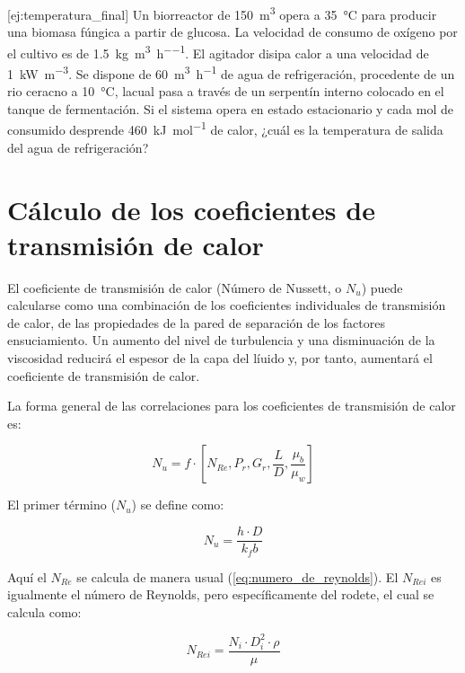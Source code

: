 \documentclass{AsignaturaResumen}
\begin{document}
[ej:temperatura_final]{
    Un biorreactor de \qty{150}{\m\cubed} opera a \qty{35}{\degreeCelsius} para producir una biomasa fúngica a partir de glucosa. La velocidad de consumo de oxígeno por el cultivo es de \qty{1.5}{\kg\per\m\cubed\per\hour}. El agitador disipa calor a una velocidad de \qty{1}{\kilo\watt\per\m\cubed}. Se dispone de \qty{60}{\m\cubed\per\hour} de agua de refrigeración, procedente de un rio ceracno a \qty{10}{\degreeCelsius}, lacual pasa a través de un serpentín interno colocado en el tanque de fermentación. Si el sistema opera en estado estacionario y cada mol de  consumido desprende \qty{460}{\kilo\J\per\mole} de calor, ¿cuál es la temperatura de salida del agua de refrigeración?
}


\section{Cálculo de los coeficientes de transmisión de calor}

El coeficiente de transmisión de calor (Número de Nussett, o $N_{u}$) puede calcularse como una combinación de los coeficientes individuales de transmisión de calor, de las propiedades de la pared de separación de los factores ensuciamiento. Un aumento del nivel de turbulencia y una disminuación de la viscosidad reducirá el espesor de la capa del líuido y, por tanto, aumentará el coeficiente de transmisión de calor.

La forma general de las correlaciones para los coeficientes de transmisión de calor es:

\begin{equation}
    N_{u} = f \cdot [N_{Re}, P_{r}, G_{r}, \frac{L}{D}, \frac{\mu_{b}}{\mu_{w}}]
\end{equation}

El primer término ($N_{u}$) se define como:

\begin{equation}
    N_{u} = \frac{h \cdot D}{k_fb}
\end{equation}

Aquí el $N_{Re}$ se calcula de manera usual (\autoref{eq:numero_de_reynolds}). El $N_{Rei}$ es igualmente el número de Reynolds, pero específicamente del rodete, el cual se calcula como:

\begin{equation}
    N_{Rei} = \frac{N_{i} \cdot D_{i}^{2} \cdot \rho}{\mu}
\end{equation}
\end{document}
